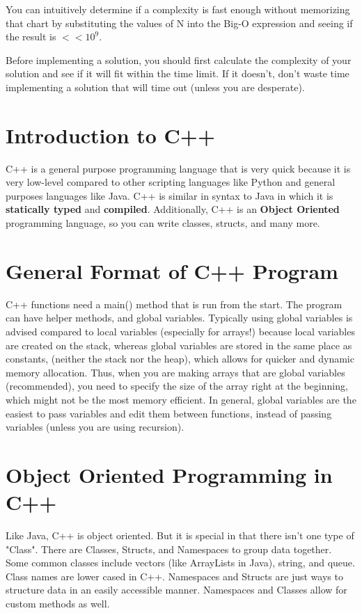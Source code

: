 \documentclass{article}
\begin{document}
You can intuitively determine if a complexity is fast enough without memorizing that chart by substituting the values of N into the Big-O expression and seeing if the result is $<<10^9.$ 

Before implementing a solution, you should first calculate the complexity of your solution and see if it will fit within the time limit. If it doesn't, don't waste time implementing a solution that will time out (unless you are desperate). 

\section{Introduction to C++}
C++ is a general purpose programming language that is very quick because it is very low-level compared to other scripting languages like Python and general purposes languages like Java. C++ is similar in syntax to Java in which it is \textbf{statically typed} and \textbf{compiled}. Additionally, C++ is an \textbf{Object Oriented} programming language, so you can write classes, structs, and many more. 

\section{General Format of C++ Program}
C++ functions need a main() method that is run from the start. The program can have helper methods, and global variables. Typically using global variables is advised compared to local variables (especially for arrays!) because local variables are created on the stack, whereas global variables are stored in the same place as constants, (neither the stack nor the heap), which allows for quicker and dynamic memory allocation. Thus, when you are making arrays that are global variables (recommended), you need to specify the size of the array right at the beginning, which might not be the most memory efficient. In general, global variables are the easiest to pass variables and edit them between functions, instead of passing variables (unless you are using recursion).

\section{Object Oriented Programming in C++}
Like Java, C++ is object oriented. But it is special in that there isn't one type of "Class". There are Classes, Structs, and Namespaces to group data together. Some common classes include vectors (like ArrayLists in Java), string, and queue. Class names are lower cased in C++. Namespaces and Structs are just ways to structure data in an easily accessible manner. Namespaces and Classes allow for custom methods as well. 
\end{document}

